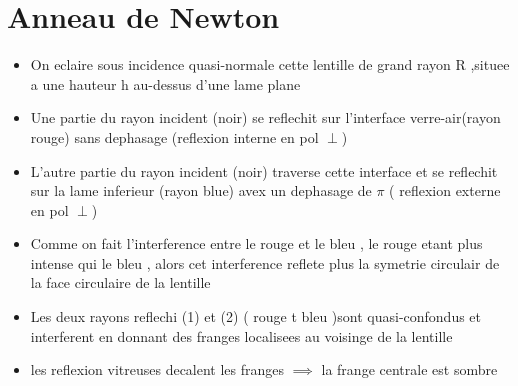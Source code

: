 \documentclass[12pt]{book}
\begin{document}
        \section{Anneau de Newton}
            \begin{center}
                \begin{minipage}{0.69\linewidth}
                    \begin{itemize}
                        \item On eclaire sous incidence quasi-normale cette lentille de grand rayon R ,situee a une hauteur h au-dessus d'une lame plane 
                        \item Une partie du rayon incident (noir) se reflechit sur l'interface verre-air(rayon rouge) sans dephasage (reflexion interne en pol $\perp$)
                        \item L'autre partie du rayon incident (noir) traverse cette interface et se reflechit sur la lame inferieur (rayon blue) avex un dephasage de $\pi$ ( reflexion externe en pol $\perp$)
                        \item Comme on fait l'interference entre le rouge et le bleu , le rouge etant plus intense qui le bleu , alors cet interference reflete plus la symetrie circulair de la face circulaire de la lentille 
                        \item Les deux rayons reflechi (1) et (2) ( rouge t bleu )sont quasi-confondus et interferent en donnant des franges localisees au voisinge de la lentille 
                        \item les reflexion vitreuses decalent les franges $\implies$ la frange centrale est sombre
                    \end{itemize}
                \end{minipage}
                \begin{minipage}{0.3\linewidth}

\end{minipage}
\end{center}
\end{document}
